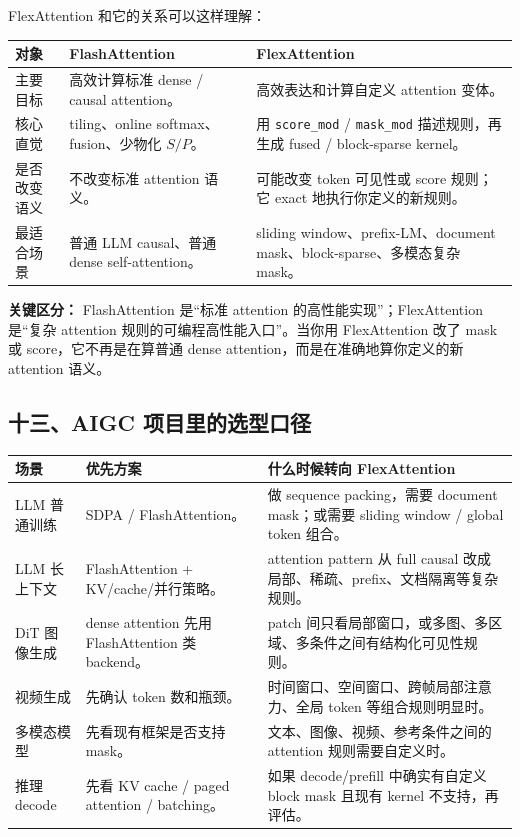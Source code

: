 FlexAttention 和它的关系可以这样理解：

\begin{center}
{\small
\begin{tabular}{p{3.2cm}p{4.7cm}p{4.8cm}}
\hline
\textbf{对象} & \textbf{FlashAttention} & \textbf{FlexAttention} \\
\hline
主要目标 & 高效计算标准 dense / causal attention。 & 高效表达和计算自定义 attention 变体。 \\
核心直觉 & tiling、online softmax、fusion、少物化 $S/P$。 & 用 \texttt{score\_mod} / \texttt{mask\_mod} 描述规则，再生成 fused / block-sparse kernel。 \\
是否改变语义 & 不改变标准 attention 语义。 & 可能改变 token 可见性或 score 规则；它 exact 地执行你定义的新规则。 \\
最适合场景 & 普通 LLM causal、普通 dense self-attention。 & sliding window、prefix-LM、document mask、block-sparse、多模态复杂 mask。 \\
\hline
\end{tabular}
}
\end{center}

\begin{conceptbox}
\textbf{关键区分：} FlashAttention 是“标准 attention 的高性能实现”；FlexAttention 是“复杂 attention 规则的可编程高性能入口”。当你用 FlexAttention 改了 mask 或 score，它不再是在算普通 dense attention，而是在准确地算你定义的新 attention 语义。
\end{conceptbox}

\subsection{十三、AIGC 项目里的选型口径}

\begin{center}
{\small
\begin{tabular}{p{3.1cm}p{4.6cm}p{5.0cm}}
\hline
\textbf{场景} & \textbf{优先方案} & \textbf{什么时候转向 FlexAttention} \\
\hline
LLM 普通训练 & SDPA / FlashAttention。 & 做 sequence packing，需要 document mask；或需要 sliding window / global token 组合。 \\
LLM 长上下文 & FlashAttention + KV/cache/并行策略。 & attention pattern 从 full causal 改成局部、稀疏、prefix、文档隔离等复杂规则。 \\
DiT 图像生成 & dense attention 先用 FlashAttention 类 backend。 & patch 间只看局部窗口，或多图、多区域、多条件之间有结构化可见性规则。 \\
视频生成 & 先确认 token 数和瓶颈。 & 时间窗口、空间窗口、跨帧局部注意力、全局 token 等组合规则明显时。 \\
多模态模型 & 先看现有框架是否支持 mask。 & 文本、图像、视频、参考条件之间的 attention 规则需要自定义时。 \\
推理 decode & 先看 KV cache / paged attention / batching。 & 如果 decode/prefill 中确实有自定义 block mask 且现有 kernel 不支持，再评估。 \\
\hline
\end{tabular}
}
\end{center}

